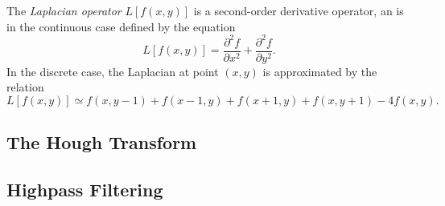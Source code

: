 The {\em Laplacian operator\/} $L[f(x,y)]$ is a second-order
derivative operator, an is in the continuous case defined by the
equation
\begin{equation}
  L[f(x,y)]=\frac{\partial^{2}f}{\partial x^{2}}+
  \frac{\partial^{2}f}{\partial y^{2}}\mbox{.}
\end{equation}
In the discrete case, the Laplacian at point $(x,y)$ is approximated
by the relation
\begin{equation}
  L[f(x,y)]\simeq f(x,y-1)+f(x-1,y)+f(x+1,y)+f(x,y+1)-4f(x,y)\mbox{.}
\end{equation}

\subsection{The Hough Transform}
\label{image:edge:hough}

\subsection{Highpass Filtering}
\label{image:edge:highpass}

